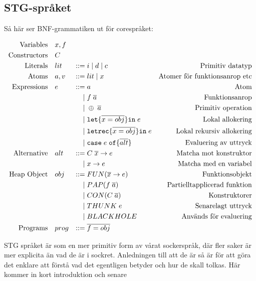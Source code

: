 \documentclass[../Core]{subfiles}
\begin{document}
\subsection{STG-språket}

Så här ser BNF-grammatiken ut för corespråket:


\begin{equation*}
\begin{aligned}
\text{Variables} \quad & x,f \\
\text{Constructors} \quad & C \\
\text{Literals}\quad&lit&::=&\;i \; | \;  d \;|\; c&\text{Primitiv datatyp} \\
\text{Atoms}\quad&a, v&::=&\;lit \; | \; x&\text{Atomer för funktionsanrop etc} \\
\text{Expressions}\quad&e&::=&\;a&\text{Atom} \\
    &&|&\;f \; \overline{a}&\text{Funktionsanrop} \\
    &&|&\;\oplus \; \overline{a}&\text{Primitiv operation} \\
    &&|&\;\mathtt{let \{} \overline{x = obj} \mathtt{ \} in } \; e&\text{Lokal allokering} \\
    &&|&\;\mathtt{letrec \{} \overline{x = obj} \mathtt{ \} in } \; e&\text{Lokal rekursiv allokering} \\
    &&|&\;\mathtt{case} \; e \;  \mathtt{ of \{ } \overline{alt} \mathtt{\}}&\text{Evaluering av uttryck} \\
\text{Alternative}\quad&alt&::=&\;C \; \overline{x} \rightarrow e&\text{Matcha mot konstruktor} \\
    &&|&\;x \rightarrow e&\text{Matcha med en variabel} \\
\text{Heap Object}\quad&obj&::=&\;FUN(\overline{x} \rightarrow e)&\text{Funktionsobjekt} \\
    &&|&\;PAP(f \; \overline{a})&\text{Partielltapplicerad funktion} \\
    &&|&\;CON(C \; \overline{a})&\text{Konstruktorer} \\
    &&|&\;THUNK \; e&\text{Senarelagt uttryck} \\
    &&|&\;BLACKHOLE&\text{Används för evaluering} \\
\text{Programs}\quad&prog&::=&\;\overline{f=obj}&\text{}
\end{aligned}
\end{equation*}

STG språket är som en mer primitiv form av vårat sockerspråk, där fler saker är mer explicita
än vad de är i sockret. Anledningen till att de är så är för att göra det enklare
att förstå vad det egentligen betyder och hur de skall tolkas. Här kommer in kort introduktion
och senare 
\end{document}
